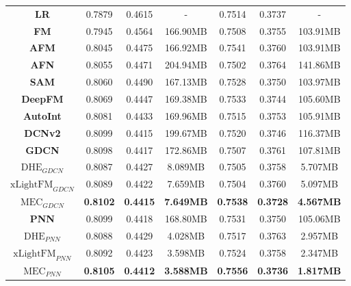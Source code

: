 \begin{table}[t]
{{\begin{tabular}{c|c|c|c|c|c|c}
    \textbf{LR} & 0.7879 & 0.4615 & - & 0.7514 & 0.3737 & - \\
    \textbf{FM} & 0.7945 & 0.4564 & 166.90MB & 0.7508 & 0.3755 & 103.91MB \\
    \textbf{AFM} & 0.8045 & 0.4475 & 166.92MB & 0.7541 & 0.3760 & 103.91MB \\
    \textbf{AFN} & 0.8055 & 0.4471 & 204.94MB & 0.7502 & 0.3764 & 141.86MB \\
    \textbf{SAM} & 0.8060 & 0.4490 & 167.13MB & 0.7528 & 0.3750 & 103.97MB \\
    \textbf{DeepFM} & 0.8069 & 0.4447 & 169.38MB & 0.7533 & 0.3744 & 105.60MB \\
    \textbf{AutoInt} & 0.8081 & 0.4433 & 169.96MB & 0.7515 & 0.3753 & 105.91MB \\
    \textbf{DCNv2} & 0.8099 & 0.4415 & 199.67MB & 0.7520 & 0.3746 & 116.37MB \\ \midrule
    \textbf{GDCN} & 0.8098 & 0.4417 & 172.86MB & 0.7507 & 0.3761 & 107.81MB \\
    \textbf{$\text{DHE}_{GDCN}$} & 0.8087 & 0.4427 & 8.089MB & 0.7505 & 0.3758 & 5.707MB \\
    \textbf{$\text{xLightFM}_{GDCN}$} & 0.8089 & 0.4422 & 7.659MB & 0.7504 & 0.3760 & 5.097MB \\
    \textbf{$\text{MEC}_{GDCN}$} & \textbf{0.8102} & \textbf{0.4415} & \textbf{7.649MB} & \textbf{0.7538} & \textbf{0.3728} & \textbf{4.567MB} \\ \midrule
    \textbf{PNN} & 0.8099 & 0.4418 & 168.80MB & 0.7531 & 0.3750 & 105.06MB \\
    \textbf{$\text{DHE}_{PNN}$} & 0.8088 & 0.4429 & 4.028MB & 0.7517 & 0.3763 & 2.957MB \\
    \textbf{$\text{xLightFM}_{PNN}$} & 0.8092 & 0.4423 & 3.598MB & 0.7524 & 0.3758 & 2.347MB \\
    \textbf{$\text{MEC}_{PNN}$} & \textbf{0.8105} & \textbf{0.4412} & \textbf{3.588MB} & \textbf{0.7556} & \textbf{0.3736} & \textbf{1.817MB} \\ \bottomrule

\end{tabular}
}}
\label{tab:MainTable}
\end{table}